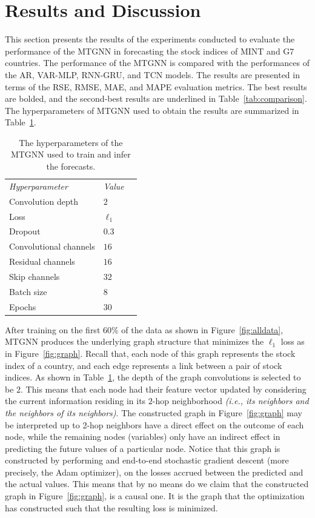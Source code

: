 \section{Results and Discussion}
\label{sec:results}
%
This section presents the results of the experiments conducted to evaluate the
performance of the MTGNN in forecasting the stock indices of MINT and G7
countries. The performance of the MTGNN is compared with the performances of the
AR, VAR-MLP, RNN-GRU, and TCN models. The results are presented in terms of the
RSE, RMSE, MAE, and MAPE evaluation metrics. The best results are bolded, and
the second-best results are underlined in Table~\ref{tab:comparison}.
%
The hyperparameters of MTGNN used to obtain the results are summarized
in Table~\ref{tab:hyperparams}. 

\begin{table}[bt]
    \caption{The hyperparameters of the MTGNN used to train and infer the forecasts.}
    \label{tab:hyperparams}
    \centering
    \begin{tabular}{ *3l }           \toprule
    \emph{Hyperparameter}  & \emph{Value} \\ \cmidrule(lr){1-2}
    Convolution depth & $2$ \\
    Loss & $\ell_1$ \\
    Dropout & $0.3$ \\
    Convolutional channels & $16$ \\
    Residual channels & $16$ \\
    Skip channels & $32$ \\
    Batch size & $8$ \\ 
    Epochs & $30$ \\
    \bottomrule
    \hline
    \end{tabular}
\end{table}
%

After training on the first $60\%$ of the data as shown in
Figure~\ref{fig:alldata}, MTGNN produces the underlying graph structure that
minimizes the $\ell_1$ loss as in Figure~\ref{fig:graph}. Recall that, each node
of this graph represents the stock index of a country, and each edge represents
a link between a pair of stock indices. As shown in Table~\ref{tab:hyperparams},
the depth of the graph convolutions is selected to be $2$. This means
that each node had their feature vector updated by considering the current
information residing in its $2$-hop neighborhood \textit{(i.e., its neighbors
and the neighbors of its neighbors)}. The constructed graph in
Figure~\ref{fig:graph} may be interpreted up to 2-hop neighbors have a direct
effect on the outcome of each node, while the remaining nodes (variables) only
have an indirect effect in predicting the future values of a particular node.
Notice that this graph is constructed by performing and end-to-end stochastic
gradient descent (more precisely, the Adam optimizer), on the losses accrued
between the predicted and the actual values. This means that by no means do we
claim that the constructed graph in Figure~\ref{fig:graph}, is a causal one. It
is the graph that the optimization has constructed such that the resulting loss
is minimized. 

